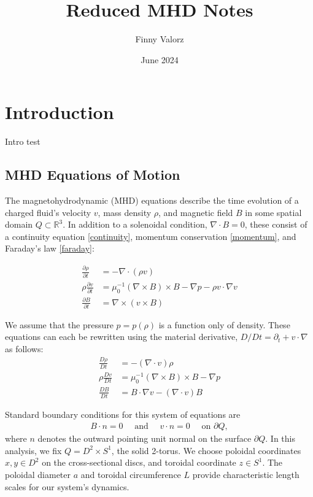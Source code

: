 \documentclass{article}
\title{Reduced MHD Notes}
\author{Finny Valorz}
\date{June 2024}
\newcommand{\p}{\partial}
\newcommand{\deriv}[2]{\frac{\p #1}{\p #2}}
\newcommand{\pth} [1] {\left( #1 \right) }
\begin{document}
\maketitle


\section{Introduction}
Intro test

\subsection{MHD Equations of Motion}
The magnetohydrodynamic (MHD) equations describe the time evolution of a charged fluid's velocity $v$, mass density $\rho$, and magnetic field $B$ in some spatial domain $Q\subset \mathbb{R}^3$. In addition to a solenoidal condition, $\nabla\cdot B=0$, these consist of a continuity equation \eqref{continuity}, momentum conservation \eqref{momentum}, and Faraday's law \eqref{faraday}:

\begin{align}
    \deriv{\rho}{t} &= -\nabla\cdot \pth{\rho v} \label{continuity} \\ 
    \rho\deriv{v}{t} &= \mu_0^{-1} \pth{\nabla\times B} \times B - \nabla p - \rho v\cdot\nabla v \label{momentum} \\ 
    \deriv{B}{t} &= \nabla \times \pth{v\times B} \label{faraday}
\end{align}

We assume that the pressure $p=p(\rho)$ is a function only of density. These equations can each be rewritten using the material derivative, $D/Dt = \p_t + v\cdot\nabla$ as follows: 
\begin{align} 
    \frac{D\rho}{Dt} &= -(\nabla\cdot v)\rho \label{material continuity} \\
    \rho\frac{Dv}{Dt} &= \mu_0^{-1}(\nabla\times B)\times B - \nabla p \label{material momentum} \\ 
    \frac{DB}{Dt} &= B\cdot\nabla v - (\nabla\cdot v)B \label{material faraday}
\end{align}

Standard boundary conditions for this system of equations are
\begin{align*} 
    B\cdot n = 0 \quad \text{ and }\quad  v\cdot n = 0 \quad \text{ on }\p Q,
\end{align*}
where $n$ denotes the outward pointing unit normal on the surface $\p Q$. In this analysis, we fix $Q=D^2\times S^1$, the solid 2-torus. We choose poloidal coordinates $x,y\in D^2$ on the cross-sectional discs, and toroidal coordinate $z \in S^1$. The poloidal diameter $a$ and toroidal circumference $L$ provide characteristic length scales for our system's dynamics. 
\end{document}
